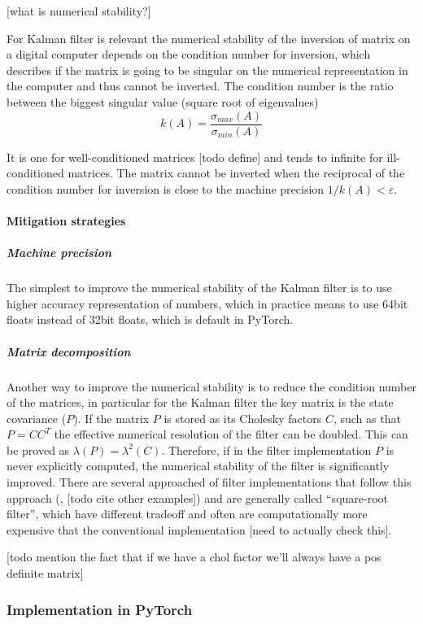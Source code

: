 \documentclass{article}
\let\Oldsubsubsection\subsubsection
\renewcommand{\subsubsection}{\FloatBarrier\Oldsubsubsection}
\begin{document}
[what is numerical stability?]

For Kalman filter is relevant the numerical stability of the inversion of matrix on a digital computer depends on the condition number for inversion, which describes if the matrix is going to be singular on the numerical representation in the computer and thus cannot be inverted. The condition number is the ratio between the biggest singular value (square root of eigenvalues)
\begin{equation}\label{condition_number}
    k(A) = \frac{\sigma_{max}(A)}{\sigma_{min}(A)}
\end{equation}

It is one for well-conditioned matrices [todo define] and tends to infinite for ill-conditioned matrices.
The matrix cannot be inverted when the reciprocal of the condition number for inversion is close to the machine precision $ 1/k(A) < \varepsilon$.

\paragraph{Mitigation strategies}

\subparagraph{Machine precision} The simplest to improve the numerical stability of the Kalman filter is to use higher accuracy representation of numbers, which in practice means to use 64bit floats instead of 32bit floats, which is default in PyTorch.

\subparagraph{Matrix decomposition} Another way to improve the numerical stability is to reduce the condition number of the matrices, in particular for the Kalman filter the key matrix is the state covariance ($P$). If the matrix $P$ is stored as its Cholesky factors $C$, such as that $P = CC^T$ the effective numerical resolution of the filter can be doubled. This can be proved as $\lambda(P) = \lambda^2(C)$. Therefore, if in the filter implementation $P$ is never explicitly computed, the numerical stability of the filter is significantly improved.
There are several approached of filter implementations that follow this approach (\cite{potter_statistical_1963}, [todo cite other examples]) and are generally called ``square-root filter'', which have different tradeoff and often are computationally more expensive that the conventional implementation [need to actually check this].

[todo mention the fact that if we have a chol factor we'll always have a pos definite matrix]

\subsubsection{Implementation in PyTorch}
\end{document}
